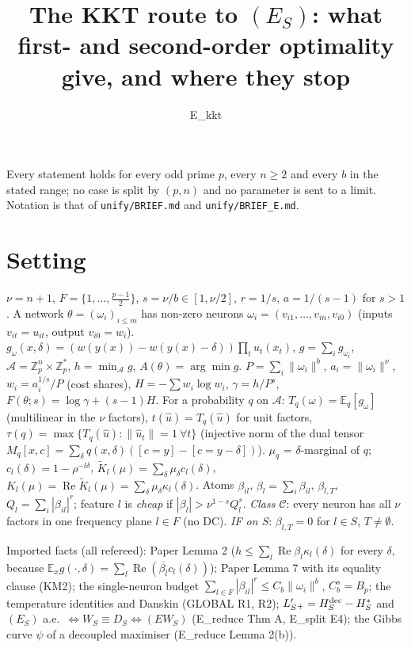 \documentclass[11pt]{article}
\theoremstyle{remark}\newtheorem{remark}[theorem]{Remark}
\newcommand{\E}{\mathbb E}\newcommand{\R}{\mathbb R}\newcommand{\Re}{\operatorname{Re}}
\begin{document}
\title{The KKT route to $(E_S)$: what first- and second-order optimality give, and where they stop}
\author{E\_kkt}\date{}\maketitle

Every statement holds for every odd prime $p$, every $n\ge2$ and every $b$ in the stated range; no case is split by $(p,n)$
and no parameter is sent to a limit. Notation is that of \texttt{unify/BRIEF.md} and \texttt{unify/BRIEF\_E.md}.

\section*{Setting}
$\nu=n+1$, $F=\{1,\dots,\frac{p-1}2\}$, $s=\nu/b\in[1,\nu/2]$, $r=1/s$, $a=1/(s-1)$ for $s>1$.
A network $\theta=(\omega_i)_{i\le m}$ has non-zero neurons $\omega_i=(v_{i1},\dots,v_{in},v_{i0})$ (inputs $v_{it}=u_{it}$, output $v_{i0}=w_i$).
$g_\omega(x,\delta)=(w(y(x))-w(y(x)-\delta))\prod_tu_t(x_t)$, $g=\sum_ig_{\omega_i}$, $\mathcal A=\mathbb Z_p^n\times\mathbb Z_p^*$,
$h=\min_{\mathcal A}g$, $A(\theta)=\arg\min g$. $P=\sum_i\|\omega_i\|^b$, $a_i=\|\omega_i\|^\nu$, $w_i=a_i^{1/s}/P$ (cost shares),
$H=-\sum w_i\log w_i$, $\gamma=h/P^s$, $F(\theta;s)=\log\gamma+(s-1)H$.
For a probability $q$ on $\mathcal A$: $T_q(\omega)=\E_q[g_\omega]$ (multilinear in the $\nu$ factors), $t(\hat u)=T_q(\hat u)$ for unit factors,
$\tau(q)=\max\{T_q(\hat u):\|\hat u_t\|=1\ \forall t\}$ (injective norm of the dual tensor $M_q[x,c]=\sum_\delta q(x,\delta)([c=y]-[c=y-\delta])$).
$\mu_q$ = $\delta$-marginal of $q$; $c_l(\delta)=1-\rho^{-l\delta}$, $\tilde K_l(\mu)=\sum_\delta\mu_\delta c_l(\delta)$, $K_l(\mu)=\Re\tilde K_l(\mu)=\sum_\delta\mu_\delta\kappa_l(\delta)$.
Atoms $\beta_{il}$, $\beta_l=\sum_i\beta_{il}$, $\beta_{l,T}$, $Q_l=\sum_i|\beta_{il}|^r$; feature $l$ is \emph{cheap} if $|\beta_l|>\nu^{1-s}Q_l^s$.
\emph{Class $\mathcal C$}: every neuron has all $\nu$ factors in one frequency plane $l\in F$ (no DC). \emph{IF on $S$}: $\beta_{l,T}=0$ for $l\in S$, $T\ne\emptyset$.

Imported facts (all refereed): Paper Lemma 2 ($h\le\sum_l\Re\beta_l\kappa_l(\delta)$ for every $\delta$, because
$\E_xg(\cdot,\delta)=\sum_l\Re(\overline{\beta_l}c_l(\delta))$); Paper Lemma 7 with its equality clause (KM2); the single-neuron budget
$\sum_{l\in F}|\beta_{il}|^r\le C_b\|\omega_i\|^b$, $C_b^s=B_p$; the temperature identities and Danskin (GLOBAL R1, R2);
$L_S'{}_+=H^{\rm dec}_S-H^*_S$ and $(E_S)$ a.e.\ $\iff W_S\equiv D_S\iff(EW_S)$ (E\_reduce Thm A, E\_split E4);
the Gibbs curve $\psi$ of a decoupled maximiser (E\_reduce Lemma 2(b)).
\end{document}
